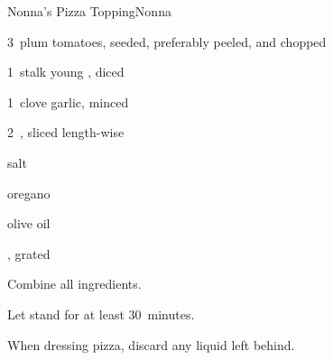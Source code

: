 \begin{recipe}{Nonna's Pizza Topping}{Nonna}{}

\begin{ingredients}
\item 3~plum tomatoes, seeded, preferably peeled, and chopped
\item 1~stalk young , diced
\item 1~clove garlic, minced
\item 2~, sliced length-wise
\item salt
\item oregano
\item olive oil
\item {}, grated 
\end{ingredients}

\begin{directions}
\item Combine all ingredients.
\item Let stand for at least 30~minutes.
\item When dressing pizza, discard any liquid left behind.
\end{directions}

\end{recipe}
